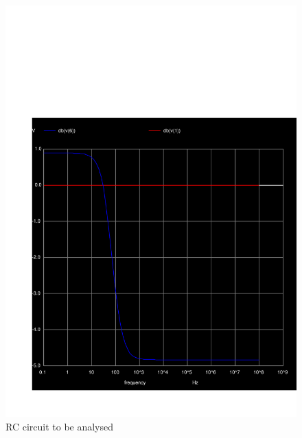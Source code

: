   \begin{figure}[H] \centering
    \includegraphics[width=1\linewidth]{../sim/mag5.pdf}
    \caption{RC circuit to be analysed}
    \label{fig:p5mag}
    \end{figure}

